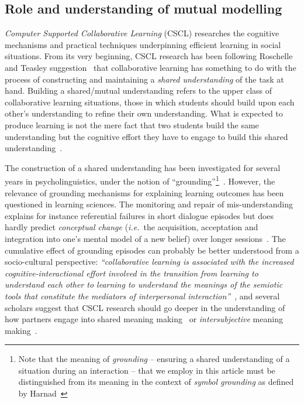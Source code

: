 \documentclass{sig-alternate}
\newcommand{\ie}{{\textit{i.e.~}}}
\begin{document}
\subsection{Role and understanding of mutual modelling}

\emph{Computer Supported Collaborative Learning} (CSCL) researches the cognitive
mechanisms and practical techniques underpinning efficient learning in social
situations. From its very beginning, CSCL research has been following
Roschelle and Teasley suggestion~\cite{roschelle1995construction} that
collaborative learning has something to do with the process of constructing and
maintaining a \emph{shared understanding} of the task at hand. Building a shared/mutual
understanding refers to the upper class of collaborative learning situations,
those in which students should build upon each other's understanding to refine
their own understanding.  What is expected to produce learning is not the mere
fact that two students build the same understanding but the cognitive effort
they have to engage to build this shared
understanding~\cite{schwartz1995emergence}.

The construction of a shared understanding has been investigated for several
years in psycholinguistics, under the  notion of ``grounding''\footnote{Note
that the meaning of \emph{grounding} -- ensuring a shared understanding of a
situation during an interaction -- that we employ in this article must be
distinguished from its meaning in the context of \emph{symbol grounding} as
defined by Harnad~\cite{harnad1990symbol}}~\cite{clark1986referring}.  However, the
relevance of grounding mechanisms for explaining learning outcomes has been
questioned in learning sciences. The monitoring and repair of mis-understanding
explains for instance referential failures in short dialogue episodes but does
hardly predict \emph{conceptual change} (\ie the acquisition, acceptation and
integration into one's mental model of a new belief)
over longer sessions~\cite{dillenbourg2006sharing}. The cumulative effect of
grounding episodes can probably be better understood from a socio-cultural
perspective: \emph{``collaborative learning is associated with the increased
    cognitive-interactional effort involved in the transition from learning to
    understand each other to learning to understand the meanings of the semiotic
    tools that constitute the mediators of interpersonal
interaction''}~\cite{baker1999role}, and
several scholars suggest that CSCL research should go deeper in the
understanding of how partners engage into shared meaning
making~\cite{stahl2007meaning} or \emph{intersubjective} meaning
making~\cite{suthers2006technology}.
\end{document}
